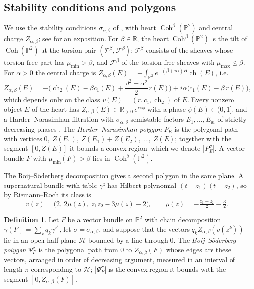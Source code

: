 \documentclass[11pt]{amsart}
\theoremstyle{definition}
\newtheorem{definition}[theorem]{Definition}
\theoremstyle{remark}
\newcommand{\PP}{\mathbb{P}}
\newcommand{\RR}{\mathbb{R}}
\begin{document}
\subsection{Stability conditions and polygons}
We use the stability conditions $\sigma_{\alpha,\beta}$ of \cite{Br08,AB13,ABCH13}, with heart $\operatorname{Coh}^\beta(\PP^2)$ and central charge $Z_{\alpha,\beta}$; see \cite{MS17} for an exposition. For $\beta\in\RR$, the heart $\operatorname{Coh}^\beta(\PP^2)$ is the tilt of $\operatorname{Coh}(\PP^2)$ at the torsion pair $(\mathcal T^\beta,\mathcal F^\beta)$: $\mathcal T^\beta$ consists of the sheaves whose torsion-free part has $\mu_{\min}>\beta$, and $\mathcal F^\beta$ of the torsion-free sheaves with $\mu_{\max}\le\beta$. For $\alpha>0$ the central charge is $Z_{\alpha,\beta}(E)=-\int_{\PP^2}e^{-(\beta+i\alpha)H}\operatorname{ch}(E)$, i.e.
\[
Z_{\alpha,\beta}(E)=-\Big(\operatorname{ch}_2(E)-\beta c_1(E)+\frac{\beta^2-\alpha^2}2\,r(E)\Big)+i\alpha\big(c_1(E)-\beta\,r(E)\big),
\]
which depends only on the class $v(E)=(r,c_1,\operatorname{ch}_2)$ of $E$. Every nonzero object $E$ of the heart has $Z_{\alpha,\beta}(E)\in\RR_{>0}\,e^{i\pi\phi}$ with a phase $\phi(E)\in(0,1]$, and a Harder--Narasimhan filtration with $\sigma_{\alpha,\beta}$-semistable factors $E_1,\dots,E_m$ of strictly decreasing phases \cite{Br07}. The \emph{Harder--Narasimhan polygon} $P^\sigma_E$ is the polygonal path with vertices $0,\ Z(E_1),\ Z(E_1)+Z(E_2),\ \dots,\ Z(E)$; together with the segment $[0,Z(E)]$ it bounds a convex region, which we denote $|P^\sigma_E|$. A vector bundle $F$ with $\mu_{\min}(F)>\beta$ lies in $\operatorname{Coh}^\beta(\PP^2)$.

The Boij--Söderberg decomposition gives a second polygon in the same plane. A supernatural bundle with table $\gamma^z$ has Hilbert polynomial $(t-z_1)(t-z_2)$, so by Riemann--Roch its class is
\[
v(z)=\big(2,\ 2\mu(z),\ z_1z_2-3\mu(z)-2\big),\qquad \mu(z)=-\tfrac{z_1+z_2}2-\tfrac32 .
\]

\begin{definition}\label{def:PsiSigma}
Let $F$ be a vector bundle on $\PP^2$ with chain decomposition $\gamma(F)=\sum_kq_k\gamma^{z^k}$, let $\sigma=\sigma_{\alpha,\beta}$, and suppose that the vectors $q_kZ_{\alpha,\beta}(v(z^k))$ lie in an open half-plane $\mathcal H$ bounded by a line through $0$. The \emph{Boij--Söderberg polygon} $\Psi^\sigma_F$ is the polygonal path from $0$ to $Z_{\alpha,\beta}(F)$ whose edges are these vectors, arranged in order of decreasing argument, measured in an interval of length $\pi$ corresponding to $\mathcal H$; $|\Psi^\sigma_F|$ is the convex region it bounds with the segment $[0,Z_{\alpha,\beta}(F)]$.
\end{definition}
\end{document}

